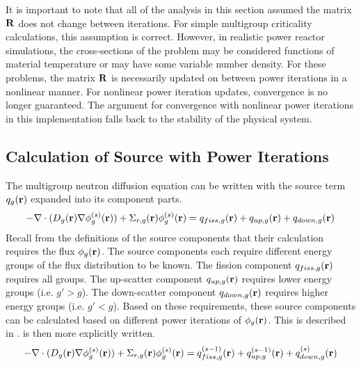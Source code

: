     It is important to note that all of the analysis in this section assumed the
    matrix $\mathbf{R}$ does not change between iterations. For simple multigroup
    criticality calculations, this assumption is correct. However, in realistic
    power reactor simulations, the cross-sections of the problem may be 
    considered functions of material temperature or may have some variable
    number density. For these problems, the matrix $\mathbf{R}$ is necessarily updated
    on between power iterations in a nonlinear manner. For nonlinear power
    iteration updates, convergence is no longer guaranteed. The argument for
    convergence with nonlinear power iterations in this implementation falls 
    back to the stability of the physical system.
    
  \subsection{Calculation of Source with Power Iterations}

    The multigroup neutron diffusion equation  can be
    written with the source term $q_g(\mathbf{r})$ expanded into its component parts.
    \begin{equation} \label{eq:multigroup_source_expand}
      -\mathbf{\nabla} \cdot (D_g(\mathbf{r}) \mathbf{\nabla} \phi_g^{(s)}(\mathbf{r})) + \Sigma_{r,g}(\mathbf{r})
      \phi_g^{(s)}(\mathbf{r}) = q_{fiss,g}(\mathbf{r}) + q_{up,g}(\mathbf{r}) + q_{down,g}(\mathbf{r})
    \end{equation}
    Recall from the definitions of the source components that their calculation
    requires the flux $\phi_g(\mathbf{r})$. The source components each require
    different energy groups of the flux distribution to be known. The fission
    component $q_{fiss,g}(\mathbf{r})$ requires all groups. The up-scatter component
    $q_{up,g}(\mathbf{r})$ requires lower energy groups (i.e. $g' > g$). The
    down-scatter component $q_{down,g}(\mathbf{r})$ requires higher energy groups (i.e.
    $g' < g$). Based on these requirements, these source components can be
    calculated based on different power iterations of $\phi_g(\mathbf{r})$. This is
    described in .
     is then more explicitly written.
    \begin{equation} \label{eq:multigroup_power_iterations}
      -\mathbf{\nabla} \cdot (D_g(\mathbf{r}) \mathbf{\nabla} \phi_g^{(s)}(\mathbf{r})) + \Sigma_{r,g}(\mathbf{r})
      \phi_g^{(s)}(\mathbf{r}) = q_{fiss,g}^{(s-1)}(\mathbf{r}) + q_{up,g}^{(s-1)}(\mathbf{r}) +
      q_{down,g}^{(s)}(\mathbf{r})
    \end{equation}

